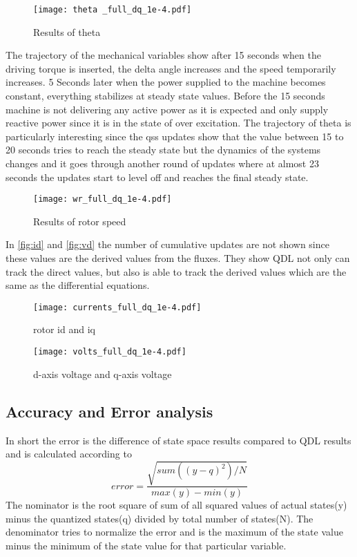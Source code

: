\documentclass{scspaperproc}
\theoremstyle{scsthe}
\begin{document}
 \begin{figure}[H]
 \FloatBarrier
    \centering
    \texttt{[image: theta \_full\_dq\_1e-4.pdf]}
    \caption{Results of theta}
    \label{fig:tehta}
\end{figure}
The trajectory of the mechanical variables show after 15 seconds when the driving torque is inserted, the delta angle increases and the speed temporarily increases. 5 Seconds later when the power supplied to the machine becomes constant, everything stabilizes at steady state values. 
Before the 15 seconds machine is not delivering any active power as it is expected and only supply reactive power since it is in the state of over excitation.
The trajectory of theta is particularly interesting since the qss updates show that the value between 15 to 20 seconds tries to reach the steady state but the dynamics of the systems changes and it goes through another round of updates where at almost 23 seconds the updates start to level off and reaches the final steady state. 

 \begin{figure}[H]
 \FloatBarrier
    \centering
    \texttt{[image: wr\_full\_dq\_1e-4.pdf]}
    \caption{Results of rotor speed}
    \label{fig:wr}
\end{figure}

In \autoref{fig:id} and \autoref{fig:vd} the number of cumulative updates are not shown since these values are the derived values from the fluxes. They show QDL not only can track the direct values, but also is able to track the derived values which are the same as the differential equations.  

 \begin{figure}[H]
 \FloatBarrier
    \centering
    \texttt{[image: currents\_full\_dq\_1e-4.pdf]}
    \caption{rotor id and iq}
    \label{fig:id}
\end{figure}

 \begin{figure}[H]
 \FloatBarrier
    \centering
    \texttt{[image: volts\_full\_dq\_1e-4.pdf]}
    \caption{d-axis voltage and q-axis voltage}
    \label{fig:vd}
\end{figure}



\subsection{Accuracy and Error analysis}
In short the error is the difference of state space results compared to QDL results and is calculated according to 
\begin{equation} \label{eq:Normalized Relative RootMean Square Error}
error= \frac{\sqrt{sum((y-q)^2)/N}} {max(y)-min(y)}
\end{equation}
The nominator is the root square of sum of all squared values of actual states(y) minus the quantized states(q) divided by total number of states(N). The denominator tries to normalize the error and is the maximum of the state value minus the minimum of the state value for that particular variable.
\end{document}

